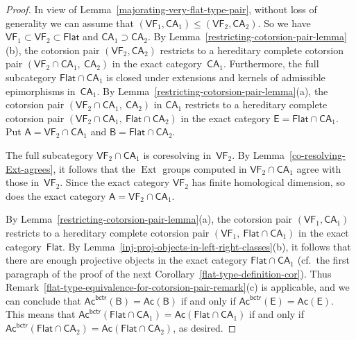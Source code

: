\documentclass[12pt,a4paper]{amsart}
\newcommand{\+}{\nobreakdash-}
\renewcommand{\:}{\colon}
\DeclareMathOperator{\Ext}{Ext}
\newcommand{\sA}{\mathsf A}
\newcommand{\sB}{\mathsf B}
\newcommand{\sE}{\mathsf E}
\newcommand{\VF}{\mathsf{VF}}
\newcommand{\CA}{\mathsf{CA}}
\newcommand{\Flat}{\mathsf{Flat}}
\newcommand{\Ac}{\mathsf{Ac}}
\newcommand{\bctr}{\mathsf{bctr}}
\theoremstyle{plain}
\theoremstyle{definition}
\begin{document}
\begin{proof}
 In view of Lemma~\ref{majorating-very-flat-type-pair}, without loss of
generality we can assume that $(\VF_1,\CA_1)\le(\VF_2,\CA_2)$.
 So we have $\VF_1\subset\VF_2\subset\Flat$ and $\CA_1\supset\CA_2$.
 By Lemma~\ref{restricting-cotorsion-pair-lemma}(b), the cotorsion pair
$(\VF_2,\CA_2)$ restricts to a hereditary complete cotorsion pair
$(\VF_2\cap\CA_1,\>\CA_2)$ in the exact category~$\CA_1$.
 Furthermore, the full subcategory $\Flat\cap\CA_1$ is closed under
extensions and kernels of admissible epimorphisms in~$\CA_1$.
 By Lemma~\ref{restricting-cotorsion-pair-lemma}(a), the cotorsion pair
$(\VF_2\cap\CA_1,\>\CA_2)$ in $\CA_1$ restricts to a hereditary
complete cotorsion pair $(\VF_2\cap\CA_1,\>\Flat\cap\CA_2)$ in
the exact category $\sE=\Flat\cap\CA_1$.
 Put $\sA=\VF_2\cap\CA_1$ and $\sB=\Flat\cap\CA_2$.

 The full subcategory $\VF_2\cap\CA_1$ is coresolving in~$\VF_2$.
 By Lemma~\ref{co-resolving-Ext-agrees}, it follows that the $\Ext$
groups computed in $\VF_2\cap\CA_1$ agree with those in~$\VF_2$.
 Since the exact category $\VF_2$ has finite homological dimension,
so does the exact category $\sA=\VF_2\cap\CA_1$.

 By Lemma~\ref{restricting-cotorsion-pair-lemma}(a), the cotorsion
pair $(\VF_1,\CA_1)$ restricts to a hereditary complete cotorsion pair
$(\VF_1,\>\Flat\cap\CA_1)$ in the exact category~$\Flat$.
 By Lemma~\ref{inj-proj-objects-in-left-right-classes}(b), it follows
that there are enough projective objects in the exact category
$\Flat\cap\CA_1$ (cf.\ the first paragraph of the proof of the next
Corollary~\ref{flat-type-definition-cor}).
 Thus Remark~\ref{flat-type-equivalence-for-cotorsion-pair-remark}(c)
is applicable, and we can conclude that $\Ac^\bctr(\sB)=\Ac(\sB)$
if and only if $\Ac^\bctr(\sE)=\Ac(\sE)$.
 This means that $\Ac^\bctr(\Flat\cap\CA_1)=\Ac(\Flat\cap\CA_1)$ if and
only if $\Ac^\bctr(\Flat\cap\CA_2)=\Ac(\Flat\cap\CA_2)$, as desired.
\end{proof}
\end{document}
